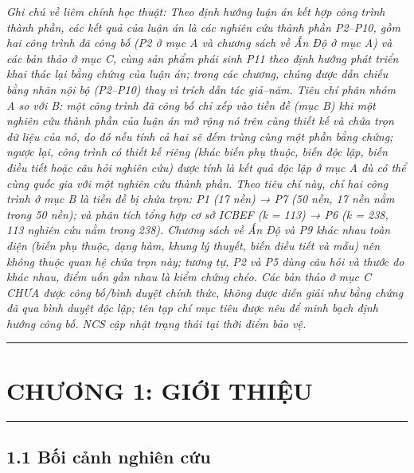 \documentclass[
  a4paper,
  13pt]{extreport}
\begin{document}
\emph{Ghi chú về liêm chính học thuật: Theo định hướng luận án kết hợp
công trình thành phần, các kết quả của luận án là các nghiên cứu thành
phần P2--P10, gồm hai công trình đã công bố (P2 ở mục A và chương sách
về Ấn Độ ở mục A) và các bản thảo ở mục C, cùng sản phẩm phái sinh P11
theo định hướng phát triển khai thác lại bằng chứng của luận án; trong
các chương, chúng được dẫn chiếu bằng nhãn nội bộ (P2--P10) thay vì
trích dẫn tác giả--năm. Tiêu chí phân nhóm A so với B: một công trình đã
công bố chỉ xếp vào tiền đề (mục B) khi một nghiên cứu thành phần của
luận án mở rộng nó trên cùng thiết kế và chứa trọn dữ liệu của nó, do đó
nếu tính cả hai sẽ đếm trùng cùng một phần bằng chứng; ngược lại, công
trình có thiết kế riêng (khác biến phụ thuộc, biến độc lập, biến điều
tiết hoặc câu hỏi nghiên cứu) được tính là kết quả độc lập ở mục A dù có
thể cùng quốc gia với một nghiên cứu thành phần. Theo tiêu chí này, chỉ
hai công trình ở mục B là tiền đề bị chứa trọn: P1 (17 nền) → P7 (50
nền, 17 nền nằm trong 50 nền); và phân tích tổng hợp cơ sở ICBEF (k =
113) → P6 (k = 238, 113 nghiên cứu nằm trong 238). Chương sách về Ấn Độ
và P9 khác nhau toàn diện (biến phụ thuộc, dạng hàm, khung lý thuyết,
biến điều tiết và mẫu) nên không thuộc quan hệ chứa trọn này; tương tự,
P2 và P5 dùng câu hỏi và thước đo khác nhau, điểm uốn gần nhau là kiểm
chứng chéo. Các bản thảo ở mục C CHƯA được công bố/bình duyệt chính
thức, không được diễn giải như bằng chứng đã qua bình duyệt độc lập; tên
tạp chí mục tiêu được nêu để minh bạch định hướng công bố. NCS cập nhật
trạng thái tại thời điểm bảo vệ.}

\begin{center}\rule{0.5\linewidth}{0.5pt}\end{center}

\newpage


\hypertarget{chux1b0ux1a1ng-1-giux1edbi-thiux1ec7u}{%
\chapter{CHƯƠNG 1: GIỚI
THIỆU}\label{chux1b0ux1a1ng-1-giux1edbi-thiux1ec7u}}

\begin{center}\rule{0.5\linewidth}{0.5pt}\end{center}

\hypertarget{bux1ed1i-cux1ea3nh-nghiuxean-cux1ee9u}{%
\section{1.1 Bối cảnh nghiên
cứu}\label{bux1ed1i-cux1ea3nh-nghiuxean-cux1ee9u}}
\end{document}
